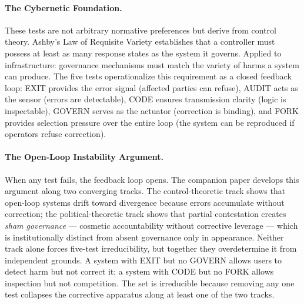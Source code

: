 \documentclass{article}
\theoremstyle{definition}
\begin{document}
\paragraph{The Cybernetic Foundation.} These tests are not arbitrary normative preferences but derive from control theory. Ashby's Law of Requisite Variety \citep{ashby1956} establishes that a controller must possess at least as many response states as the system it governs. Applied to infrastructure: governance mechanisms must match the variety of harms a system can produce. The five tests operationalize this requirement as a closed feedback loop: EXIT provides the error signal (affected parties can refuse), AUDIT acts as the sensor (errors are detectable), CODE ensures transmission clarity (logic is inspectable), GOVERN serves as the actuator (correction is binding), and FORK provides selection pressure over the entire loop (the system can be reproduced if operators refuse correction).

\paragraph{The Open-Loop Instability Argument.} When any test fails, the feedback loop opens. The companion paper develops this argument along two converging tracks. The control-theoretic track shows that open-loop systems drift toward divergence because errors accumulate without correction; the political-theoretic track shows that partial contestation creates \textit{sham governance} --- cosmetic accountability without corrective leverage --- which is institutionally distinct from absent governance only in appearance. Neither track alone forces five-test irreducibility, but together they overdetermine it from independent grounds. A system with EXIT but no GOVERN allows users to detect harm but not correct it; a system with CODE but no FORK allows inspection but not competition. The set is irreducible because removing any one test collapses the corrective apparatus along at least one of the two tracks.
\end{document}
